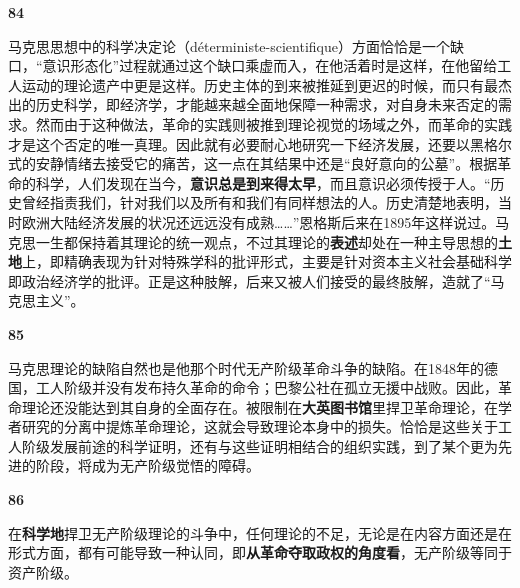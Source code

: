 \documentclass[fontset=fandol, a4paper, 12pt, openright]{ctexbook}
\makeatletter
\newcommand{\thesis}[1]{%
    \par\vspace{1.5em}%
    {\centering \textbf{\Large #1}\par}%
    \nobreak\vspace{0.5em}\nobreak
    \@afterindenttrue %
    \@afterheading    %
}
\makeatother
\begin{document}
\thesis{84}
马克思思想中的科学决定论（déterministe-scientifique）方面恰恰是一个缺口，“意识形态化”过程就通过这个缺口乘虚而入，在他活着时是这样，在他留给工人运动的理论遗产中更是这样。历史主体的到来被推延到更迟的时候，而只有最杰出的历史科学，即经济学，才能越来越全面地保障一种需求，对自身未来否定的需求。然而由于这种做法，革命的实践则被推到理论视觉的场域之外，而革命的实践才是这个否定的唯一真理。因此就有必要耐心地研究一下经济发展，还要以黑格尔式的安静情绪去接受它的痛苦，这一点在其结果中还是“良好意向的公墓”。根据革命的科学，人们发现在当今，\textbf{意识总是到来得太早}，而且意识必须传授于人。“历史曾经指责我们，针对我们以及所有和我们有同样想法的人。历史清楚地表明，当时欧洲大陆经济发展的状况还远远没有成熟……”恩格斯后来在1895年这样说过。马克思一生都保持着其理论的统一观点，不过其理论的\textbf{表述}却处在一种主导思想的\textbf{土地}上，即精确表现为针对特殊学科的批评形式，主要是针对资本主义社会基础科学即政治经济学的批评。正是这种肢解，后来又被人们接受的最终肢解，造就了“马克思主义”。

\thesis{85}
马克思理论的缺陷自然也是他那个时代无产阶级革命斗争的缺陷。在1848年的德国，工人阶级并没有发布持久革命的命令；巴黎公社在孤立无援中战败。因此，革命理论还没能达到其自身的全面存在。被限制在\textbf{大英图书馆}里捍卫革命理论，在学者研究的分离中提炼革命理论，这就会导致理论本身中的损失。恰恰是这些关于工人阶级发展前途的科学证明，还有与这些证明相结合的组织实践，到了某个更为先进的阶段，将成为无产阶级觉悟的障碍。

\thesis{86}
在\textbf{科学地}捍卫无产阶级理论的斗争中，任何理论的不足，无论是在内容方面还是在形式方面，都有可能导致一种认同，即\textbf{从革命夺取政权的角度看}，无产阶级等同于资产阶级。
\end{document}
